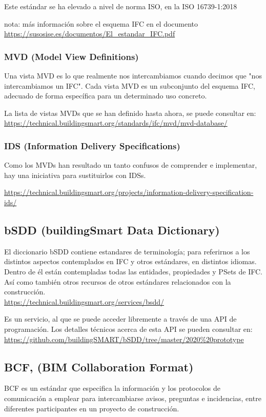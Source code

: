\documentclass[spanish,12pt,a4paper,final,oneside]{book}
\begin{document}
Este estándar se ha elevado a nivel de norma ISO, en la ISO 16739-1:2018

nota: más información sobre el esquema IFC en el documento \url{https://susosise.es/documentos/El_estandar_IFC.pdf}


\subsubsection{MVD (Model View Definitions)}
Una vista MVD es lo que realmente nos intercambiamos cuando decimos que "nos intercambiamos un IFC". Cada vista MVD es un subconjunto del esquema IFC, adecuado de forma específica para un determinado uso concreto.

La lista de vistas MVDs que se han definido hasta ahora, se puede consultar en: \url{https://technical.buildingsmart.org/standards/ifc/mvd/mvd-database/}

\subsubsection{IDS (Information Delivery Specifications)}
Como los MVDs han resultado un tanto confusos de comprender e implementar, hay una iniciativa para sustituirlos con IDSs.

\url{https://technical.buildingsmart.org/projects/information-delivery-specification-ids/}


\subsection{bSDD (buildingSmart Data Dictionary)}
El diccionario bSDD contiene estandares de terminología; para referirnos a los distintos aspectos contemplados en IFC y otros estándares, en distintos idiomas.
\\Dentro de él están contempladas todas las entidades, propiedades y PSets de IFC. Así como también otros recursos de otros estándares relacionados con la construcción.
\\ \url{https://technical.buildingsmart.org/services/bsdd/}

Es un servicio, al que se puede acceder libremente a través de una API de programación. Los detalles técnicos acerca de esta API se pueden consultar en: \url{https://github.com/buildingSMART/bSDD/tree/master/2020%20prototype}


\subsection{BCF, ({\small BIM} Collaboration Format)}
BCF es un estándar que especifica la información y los protocolos de comunicación a emplear para intercambiarse avisos, preguntas e incidencias, entre diferentes participantes en un proyecto de construcción. 
\end{document}
